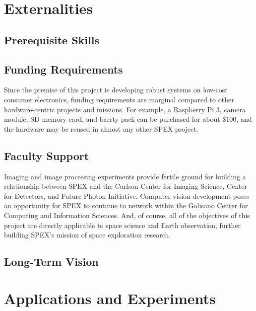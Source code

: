 \documentclass[conference]{IEEEtran} %
\begin{document}
\section{Externalities}
\subsection{Prerequisite Skills}


\subsection{Funding Requirements}
Since the premise of this project is developing robust systems on low-cost consumer electronics, funding requirements are marginal compared to other hardware-centric projects and missions.
For example, a Raspberry Pi 3, camera module, SD memory card, and barrty pack can be purchased for about $\$100$, and the hardware may be reused in almost any other SPEX project.

\subsection{Faculty Support}
Imaging and image processing experiments provide fertile ground for building a relationship between SPEX and the Carlson Center for Imaging Science, Center for Detectors, and Future Photon Initiative.
Computer vision development poses an opportunity for SPEX to continue to network within the Golisano Center for Computing and Information Sciences.
And, of course, all of the objectives of this project are directly applicable to space science and Earth observation, further building SPEX's mission of space exploration research.

\subsection{Long-Term Vision}
\label{sec:vision}


\section{Applications and Experiments}
\label{sec:payloads}
\end{document}
